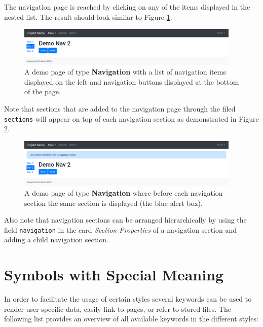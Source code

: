 \documentclass[a4paper,oneside]{book}
\begin{document}
The navigation page  is reached by clicking on any of the items displayed in the nested list.
The result should look similar to Figure \ref{fig.demo-nav-page}.

\begin{figure}[ht]
    \centering
    \includegraphics[width=0.95\textwidth]{demo-nav-page.png}
    \caption{A demo page of type \textbf{Navigation} with a list of navigation items displayed on the left and navigation buttons displayed at the bottom of the page.}
    \label{fig.demo-nav-page}
\end{figure}

Note that sections that are added to the navigation page  through the filed \texttt{sections} will appear on top of each navigation section as demonstrated in Figure \ref{fig.demo-nav-page-head}.

\begin{figure}[ht]
    \centering
    \includegraphics[width=0.95\textwidth]{demo-nav-page-head.png}
    \caption{A demo page of type \textbf{Navigation} where before each navigation section the same section is displayed (the blue alert box).}
    \label{fig.demo-nav-page-head}
\end{figure}

Also note that navigation sections can be arranged hierarchically by using the field \texttt{navigation} in the card \emph{Section Properties} of a navigation section and adding a child navigation section.

\chapter{Symbols with Special Meaning}
In order to facilitate the usage of certain styles several keywords can be used to render user-specific data, easily link to pages, or refer to stored files.
The following list provides an overview of all available keywords in the different styles:
\end{document}
